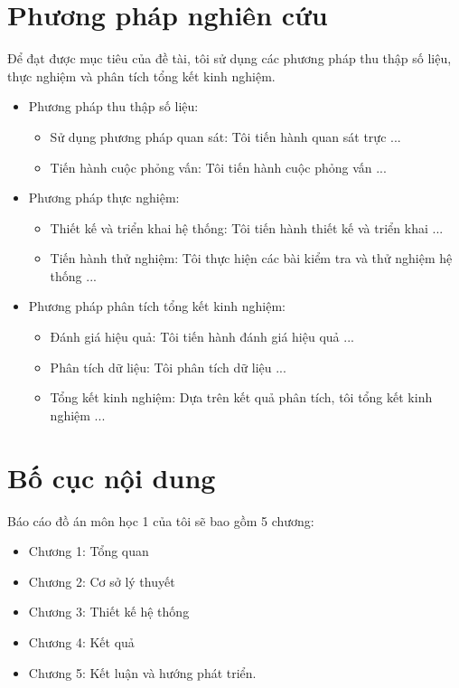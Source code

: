 \section{Phương pháp nghiên cứu}
Để đạt được mục tiêu của đề tài, tôi sử dụng các phương pháp thu thập số liệu, thực nghiệm và phân tích tổng kết kinh nghiệm. 
\begin{itemize}
    \item Phương pháp thu thập số liệu:
    \begin{itemize}
        \item Sử dụng phương pháp quan sát: Tôi tiến hành quan sát trực ...
        \item Tiến hành cuộc phỏng vấn: Tôi tiến hành cuộc phỏng vấn ...
    \end{itemize}
    \item Phương pháp thực nghiệm: 
    \begin{itemize}
        \item Thiết kế và triển khai hệ thống: Tôi tiến hành thiết kế và triển khai ...
        \item Tiến hành thử nghiệm: Tôi thực hiện các bài kiểm tra và thử nghiệm hệ thống ...
    \end{itemize}    
    \item Phương pháp phân tích tổng kết kinh nghiệm: 
    \begin{itemize}
        \item Đánh giá hiệu quả: Tôi tiến hành đánh giá hiệu quả ...
        \item Phân tích dữ liệu: Tôi phân tích dữ liệu ...
        \item Tổng kết kinh nghiệm: Dựa trên kết quả phân tích, tôi tổng kết kinh nghiệm ...
    \end{itemize}
\end{itemize}

\section{Bố cục nội dung}
Báo cáo đồ án môn học 1 của tôi sẽ bao gồm 5 chương:
\begin{itemize}
    \item Chương 1: Tổng quan
    \item Chương 2: Cơ sở lý thuyết
    \item Chương 3: Thiết kế hệ thống
    \item Chương 4: Kết quả
    \item Chương 5: Kết luận và hướng phát triển.
\end{itemize}




